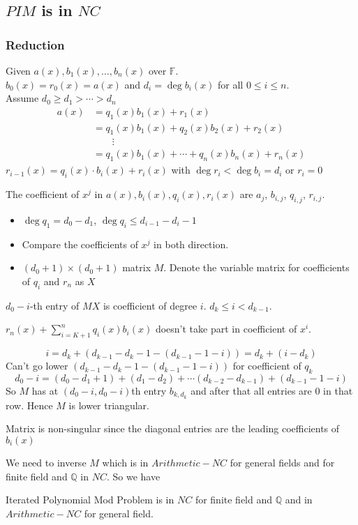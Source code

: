 \documentclass[article,10pt]{beamer}%
\newcommand{\bbF}{\mathbb{F}}
\begin{document}
\subsection{$PIM$ is in $NC$}
\begin{frame}[allowframebreaks]
	\frametitle{Reduction}
	Given $a(x),b_1(x),\dots, b_n(x)$ over $\bbF$.\\
	$b_0(x)=r_0(x)=a(x)$ and $d_i=\deg b_i(x)$ for all $0\leq i\leq n$.\\
	 Assume $d_0\geq d_1> \cdots > d_n$
	 \begin{align*}
	 	a(x) & = q_1(x)b_1(x)+r_1(x)\\
	 	& = q_1(x)b_1(x)+q_2(x)b_2(x)+r_2(x)\\
	 	& \qquad \vdots\\
	 	& = q_1(x)b_1(x)+\cdots+q_n(x)b_n(x)+r_n(x)
	 \end{align*}
	 $r_{i-1}(x)=q_i(x)\cdot b_i(x)+r_i(x)$ with 	 $	\deg r_i<\deg b_i=d_i$ or $r_i=0$ 
	\framebreak
	
	The coefficient of $x^j$ in $a(x), b_i(x), q_i(x), r_i(x)$ are $a_j$, $b_{i,j}$, $q_{i,j}$, $ r_{i,j}$. 
	\begin{itemize}
		\item $\deg q_1=d_0-d_1$, $\deg q_i\leq d_{i-1}-d_{i}-1$
		\item Compare the coefficients of $x^j$ in both direction.
		\item $(d_0+1)\times (d_0+1)$  matrix $M$. Denote the variable matrix for coefficients of $q_i$ and $r_n$ as $X$
	\end{itemize}\framebreak
	
 $d_0-i$-th entry of $MX$ is coefficient of  degree $i$. $d_{k}\leq i<d_{k-1}$. 
 
 $r_n(x)+\sum\limits_{i=K+1}^nq_i(x)b_i(x)$ doesn't take part in coefficient of $x^i$.
 
 $$i=d_k +  (d_{k-1}-d_{k}-1-(d_{k-1}-1-i))=d_k + (i-d_{k})$$Can't go lower  $(d_{k-1}-d_{k}-1-(d_{k-1}-1-i))$ for coefficient of $q_k$
 $$d_0-i=(d_0-d_1+1)+(d_1-d_2)+\cdots (d_{k-2}-d_{k-1})+(d_{k-1}-1-i)$$
 So $M$ has at $(d_0-i,d_0-i)$th entry $b_{k,d_k}$ and after that all entries are 0 in that row. Hence $M$ is lower triangular.\vspace{2mm}
 
Matrix is non-singular since the diagonal entries are the leading coefficients of $b_i(x)$ \framebreak


We need to inverse $M$ which is in $Arithmetic-NC$ for general fields and for finite field and $\mathbb{Q}$ in $NC$. So we have 
\begin{theorem}
	Iterated Polynomial Mod Problem is in $NC$ for finite field and $\mathbb{Q}$ and in $Arithmetic-NC$ for general field.
\end{theorem}
	
\end{frame}
\end{document}
